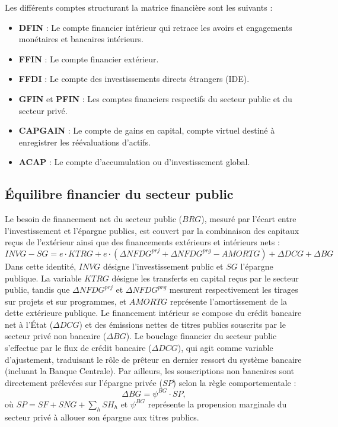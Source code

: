 \documentclass[11pt,a4paper]{article}
\newcommand{\BRG}{\mathit{BRG}}
\newcommand{\SNG}{\mathit{SNG}}
\newcommand{\SF}{\mathit{SF}}
\newcommand{\SG}{\mathit{SG}}
\newcommand{\SH}{\mathit{SH}}
\newcommand{\INVG}{\mathit{INVG}}
\newcommand{\KTRG}{\mathit{KTRG}}
\newcommand{\NFDG}{\mathit{NFDG}}
\newcommand{\DCG}{\mathit{DCG}}
\newcommand{\BG}{\mathit{BG}}
\newcommand{\AMORTG}{\mathit{AMORTG}}
\newcommand{\SP}{\mathit{SP}}
\begin{document}
	Les différents comptes structurant la matrice financière sont les suivants :
	\begin{itemize}
		\item \textbf{DFIN} : Le compte financier intérieur qui retrace les avoirs et engagements monétaires et bancaires intérieurs.
		\item \textbf{FFIN} : Le compte financier extérieur.
		\item \textbf{FFDI} : Le compte des investissements directs étrangers (IDE).
		\item \textbf{GFIN} et \textbf{PFIN} : Les comptes financiers respectifs du secteur public et du secteur privé.
		\item \textbf{CAPGAIN} : Le compte de gains en capital, compte virtuel destiné à enregistrer les réévaluations d'actifs.
		\item \textbf{ACAP} : Le compte d'accumulation ou d'investissement global.
	\end{itemize}
	
	\subsection{Équilibre financier du secteur public}
	Le besoin de financement net du secteur public ($\BRG$), mesuré par l'écart entre l'investissement et l'épargne publics, est couvert par la combinaison des capitaux reçus de l'extérieur ainsi que des financements extérieurs et intérieurs nets :
	\begin{equation*}
		\INVG - \SG = e \cdot \KTRG + e \cdot \left(\Delta\NFDG^{\mathit{prj}} +  \Delta\NFDG^{\mathit{prg}} - \AMORTG\right) + \Delta\DCG + \Delta\BG
	\end{equation*}
	Dans cette identité, $\INVG$ désigne l'investissement public et $\SG$ l'épargne publique. La variable $\KTRG$ désigne les transferts en capital reçus par le secteur public, tandis que $\Delta\NFDG^{\mathit{prj}}$ et $\Delta\NFDG^{\mathit{prg}}$ mesurent respectivement les tirages sur projets et sur programmes, et $\AMORTG$ représente l'amortissement de la dette extérieure publique. Le financement intérieur se compose du crédit bancaire net à l'État ($\Delta\DCG$) et des émissions nettes de titres publics souscrits par le secteur privé non bancaire ($\Delta\BG$). Le bouclage financier du secteur public s'effectue par le flux de crédit bancaire ($\Delta\DCG$), qui agit comme variable d'ajustement, traduisant le rôle de prêteur en dernier ressort du système bancaire (incluant la Banque Centrale). Par ailleurs, les souscriptions non bancaires sont directement prélevées sur l'épargne privée ($\SP$) selon la règle comportementale :
	\begin{equation*}
		\Delta\BG = \psi^{\BG} \cdot \SP,
	\end{equation*}
	où $\SP = \SF + \SNG + \sum_{h}\SH_h $ et $\psi^{\BG}$ représente la propension marginale du secteur privé à allouer son épargne aux titres publics.   
	
\end{document}
